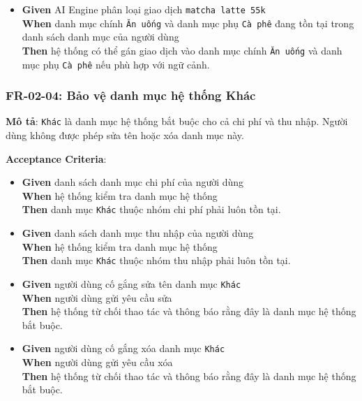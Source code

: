 \begin{itemize}
\item \textbf{Given} AI Engine phân loại giao dịch \texttt{matcha latte 55k}  \\ \hspace*{1.5em}  \textbf{When} danh mục chính \texttt{Ăn uống} và danh mục phụ \texttt{Cà phê} đang tồn tại trong danh sách danh mục của người dùng  \\ \hspace*{1.5em}  \textbf{Then} hệ thống có thể gán giao dịch vào danh mục chính \texttt{Ăn uống} và danh mục phụ \texttt{Cà phê} nếu phù hợp với ngữ cảnh.
\end{itemize}
\subsubsection{FR-02-04: Bảo vệ danh mục hệ thống Khác}

\textbf{Mô tả}: \texttt{Khác} là danh mục hệ thống bắt buộc cho cả chi phí và thu nhập. Người dùng không được phép sửa tên hoặc xóa danh mục này.



\textbf{Acceptance Criteria}:

\begin{itemize}
\item \textbf{Given} danh sách danh mục chi phí của người dùng  \\ \hspace*{1.5em}  \textbf{When} hệ thống kiểm tra danh mục hệ thống  \\ \hspace*{1.5em}  \textbf{Then} danh mục \texttt{Khác} thuộc nhóm chi phí phải luôn tồn tại.
\item \textbf{Given} danh sách danh mục thu nhập của người dùng  \\ \hspace*{1.5em}  \textbf{When} hệ thống kiểm tra danh mục hệ thống  \\ \hspace*{1.5em}  \textbf{Then} danh mục \texttt{Khác} thuộc nhóm thu nhập phải luôn tồn tại.
\item \textbf{Given} người dùng cố gắng sửa tên danh mục \texttt{Khác}  \\ \hspace*{1.5em}  \textbf{When} người dùng gửi yêu cầu sửa  \\ \hspace*{1.5em}  \textbf{Then} hệ thống từ chối thao tác và thông báo rằng đây là danh mục hệ thống bắt buộc.
\item \textbf{Given} người dùng cố gắng xóa danh mục \texttt{Khác}  \\ \hspace*{1.5em}  \textbf{When} người dùng gửi yêu cầu xóa  \\ \hspace*{1.5em}  \textbf{Then} hệ thống từ chối thao tác và thông báo rằng đây là danh mục hệ thống bắt buộc.
\end{itemize}
